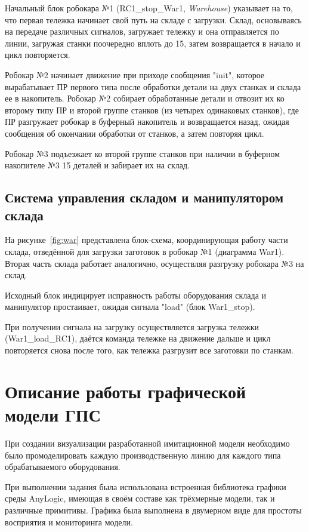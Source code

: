 Начальный блок робокара №1 (RC1\_stop\_War1, \textit{Warehouse}) указывает на то, что первая тележка начинает свой путь на складе с загрузки. Склад, основываясь на передаче различных сигналов, загружает тележку и она отправляется по линии, загружая станки поочередно вплоть до 15, затем возвращается в начало и цикл повторяется.

Робокар №2 начинает движение при приходе сообщения "init", которое вырабатывает ПР первого типа после обработки детали на двух станках и склада ее в накопитель. Робокар №2 собирает обработанные детали и отвозит их ко второму типу ПР и второй группе станков (из четырех одинаковых станков), где ПР разгружает робокар в буферный накопитель и возвращается назад, ожидая сообщения об окончании обработки от станков, а затем повторяя цикл.

Робокар №3 подъезжает ко второй группе станков при наличии в буферном накопителе №3 15 деталей и забирает их на склад.

\subsection{Система управления складом и манипулятором склада}

На рисунке~\ref{fig:war} представлена блок-схема, координирующая работу части склада, отведённой для загрузки заготовок в робокар №1 (диаграмма War1). Вторая часть склада работает аналогично, осуществляя разгрузку робокара №3 на склад.

Исходный блок индицирует исправность работы оборудования склада и манипулятор простаивает, ожидая сигнала "load" (блок War1\_stop).

При получении сигнала на загрузку осуществляется загрузка тележки (War1\_load\_RC1), даётся команда тележке на движение дальше и цикл повторяется снова после того, как тележка разгрузит все заготовки по станкам.

\section{Описание работы графической модели ГПС}

При создании визуализации разработанной имитационной модели необходимо было промоделировать каждую производственную линию для каждого типа обрабатываемого оборудования.

При выполнении задания была использована встроенная библиотека графики среды AnyLogic, имеющая в своём составе как трёхмерные модели, так и различные примитивы. Графика была выполнена в двумерном виде для простоты восприятия и мониторинга модели.

